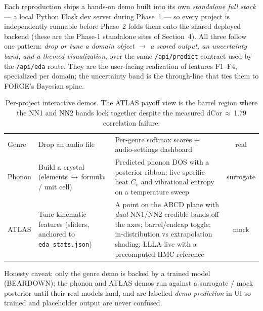 Each reproduction ships a hands-on demo built into its own \emph{standalone full stack} --- a local Python Flask dev server during Phase~1 --- so every project is independently runnable before Phase~2 folds them onto the shared deployed backend (these are the Phase-1 standalone sites of Section~4). All three follow one pattern: \emph{drop or tune a domain object $\rightarrow$ a scored output, an uncertainty band, and a themed visualization}, over the same \texttt{/api/predict} contract used by the \texttt{/api/eda} route. They are the user-facing realization of features F1--F4, specialized per domain; the uncertainty band is the through-line that ties them to FORGE's Bayesian spine.

\begin{table}[H]
\centering\renewcommand{\arraystretch}{1.3}
\begin{tabularx}{\linewidth}{|l|Y|Y|c|}
\hline
{} &  &  &  \\ \hline
Genre & Drop an audio file & Per-genre softmax scores + audio-settings dashboard & real \\ \hline
Phonon & Build a crystal (elements\,$\rightarrow$\,formula / unit cell) & Predicted phonon DOS with a posterior ribbon; live specific heat $C_v$ and vibrational entropy on a temperature sweep & surrogate \\ \hline
ATLAS & Tune kinematic features (sliders, anchored to \texttt{eda\_stats.json}) & A point on the ABCD plane with \emph{dual} NN1/NN2 credible bands off the axes; barrel/endcap toggle; in-distribution vs extrapolation shading; LLLA live with a precomputed HMC reference & mock \\ \hline
\end{tabularx}
\caption{Per-project interactive demos. The ATLAS payoff view is the barrel region where the NN1 and NN2 bands lock together despite the measured dCor\,$\approx$\,1.79 correlation failure.}
\end{table}

\noindent Honesty caveat: only the genre demo is backed by a trained model (BEARDOWN); the phonon and ATLAS demos run against a surrogate / mock posterior until their real models land, and are labelled \emph{demo prediction} in-UI so trained and placeholder output are never confused.

\preparedby

